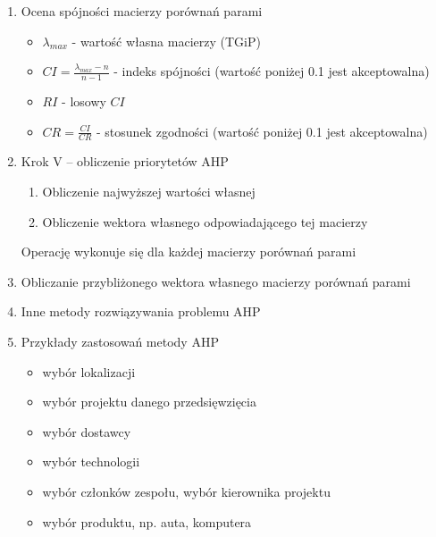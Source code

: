 \documentclass[11pt]{article}
\begin{document}
\begin{enumerate}
        \item Ocena spójności macierzy porównań parami\\
        \begin{itemize}
        	\item $\lambda_{max}$ - wartość własna macierzy (TGiP)
        	\item $CI = \frac{\lambda_{max} - n}{n - 1}$ - indeks spójności (wartość poniżej 0.1 jest akceptowalna)
        	\item $RI$ - losowy $CI$
        	\item $CR = \frac{CI}{CR}$ - stosunek zgodności (wartość poniżej 0.1 jest akceptowalna) 
        \end{itemize}
        \item Krok V – obliczenie priorytetów AHP
        \begin{enumerate}
        	\item Obliczenie najwyższej wartości własnej
        	\item Obliczenie wektora własnego odpowiadającego tej macierzy
        \end{enumerate}
        Operację wykonuje się dla każdej macierzy porównań parami
        
        \item Obliczanie przybliżonego wektora własnego macierzy porównań parami
        \item Inne metody rozwiązywania problemu AHP
        \item Przykłady zastosowań metody AHP
        \begin{itemize}
        	\item wybór lokalizacji
        	\item wybór projektu danego przedsięwzięcia
        	\item wybór dostawcy
        	\item wybór technologii
        	\item wybór członków zespołu, wybór kierownika projektu
        	\item wybór produktu, np. auta, komputera
        \end{itemize}
    \end{enumerate}
\end{document}
